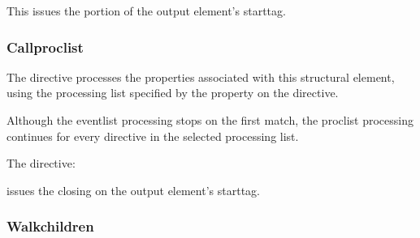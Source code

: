 \documentclass[letterpaper,12pt,english,openany,oneside]{sphinxmanual}
\begin{document}
This issues the  portion of the output element’s start\sphinxhyphen{}tag.


\subsubsection{Call\sphinxhyphen{}proc\sphinxhyphen{}list}
\label{\detokenize{index:call-proc-list}}
\begin{sphinxVerbatim}[commandchars=\\\{\}]
   
\end{sphinxVerbatim}

The  directive processes the properties associated with this structural element, using the processing list specified by the  property on the  directive.

Although the event\sphinxhyphen{}list processing stops on the first match, the proc\sphinxhyphen{}list processing continues for every directive in the selected processing list.

The directive:

\begin{sphinxVerbatim}[commandchars=\\\{\}]
 
\end{sphinxVerbatim}

issues the closing  on the output element’s start\sphinxhyphen{}tag.


\subsubsection{Walk\sphinxhyphen{}children}
\label{\detokenize{index:walk-children}}
\begin{sphinxVerbatim}[commandchars=\\\{\}]
   
\end{sphinxVerbatim}
\end{document}
